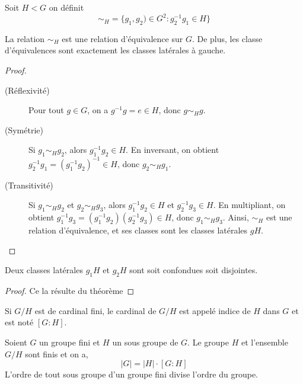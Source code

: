 \begin{definition}
    Soit $H<G$ on définit 
    \begin{equation*}
        \sim _H =\{ g_1,g_2)\in G^{2}:g^{-1}_2g_1\in H\}
    \end{equation*}
\end{definition}

\begin{theoreme}
    La relation $\sim _H$ est une relation d'équivalence sur $G$. De plus, les classe d'équivalences sont exactement les classes latérales à gauche.
\end{theoreme}

\begin{proof}
    \begin{description}
        \item[(Réflexivité)] Pour tout \( g \in G \), on a \( g^{-1} g = e \in H \), donc \( g \sim_H g \).
        \item[(Symétrie)] Si \( g_1 \sim_H g_2 \), alors \( g_1^{-1} g_2 \in H \). En inversant, on obtient \( g_2^{-1} g_1 = (g_1^{-1} g_2)^{-1} \in H \), donc \( g_2 \sim_H g_1 \).
        \item[(Transitivité)] Si \( g_1 \sim_H g_2 \) et \( g_2 \sim_H g_3 \), alors \( g_1^{-1} g_2 \in H \) et \( g_2^{-1} g_3 \in H \). En multipliant, on obtient \( g_1^{-1} g_3 = (g_1^{-1} g_2)(g_2^{-1} g_3) \in H \), donc \( g_1 \sim_H g_3 \). Ainsi, \( \sim_H \) est une relation d'équivalence, et ses classes sont les classes latérales \( gH \).
    \end{description}
\end{proof}

\begin{proposition}
    Deux classes latérales $g_1H$ et $g_2H$ sont soit confondues soit disjointes.
\end{proposition}

\begin{proof}
    Ce la résulte du théorème %
\end{proof}

\begin{definition}
    Si $G/H$ est de cardinal fini, le cardinal de $G/H$ est appelé indice de $H$ dans $G$ et est noté $[G:H]$.
\end{definition}

\begin{theoreme}\label{theo:Lagrange}
    Soient $G$ un groupe fini et $H$ un sous groupe de $G$. Le groupe $H$ et l'ensemble $G/H$ sont finis et on a,
    \begin{equation*}
        \left| G\right| = \left| H\right|\cdot [G:H]
    \end{equation*}
    L'ordre de tout sous groupe d'un groupe fini divise l'ordre du groupe.
\end{theoreme}

